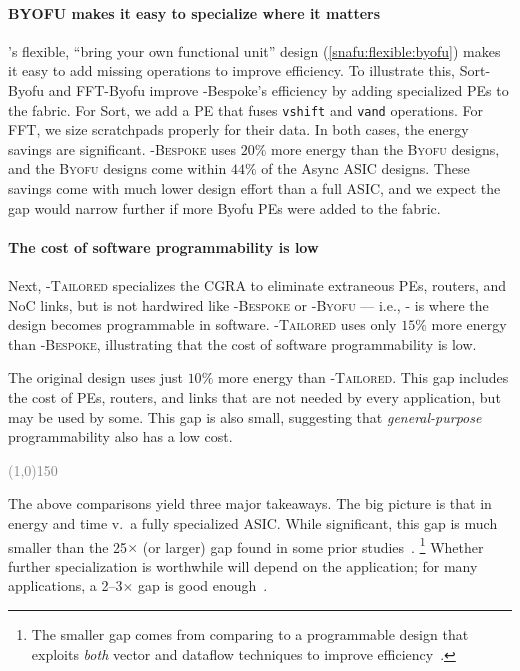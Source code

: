 \paragraph{BYOFU makes it easy to specialize where it matters}
\snafu's flexible, ``bring your own functional unit'' design
(\autoref{snafu:flexible:byofu}) makes it easy to add missing operations
to improve efficiency.
%
To illustrate this,
Sort-{\sc Byofu} and FFT-{\sc Byofu}
improve {\sc \snafu-Bespoke}'s efficiency by adding specialized PEs to the fabric.
% 
For Sort, we add a PE that fuses {\tt vshift} and {\tt vand} operations.
% 
For FFT, we size scratchpads properly for their data.
% 
In both cases, the energy savings are significant.
% 
{\scshape \snafu-Bespoke} uses $20\%$ more energy than the {\scshape Byofu} designs, and the {\scshape Byofu} designs come within $44\%$ of the {\sc Async} ASIC designs.
%
These savings come with much lower design effort than a full ASIC, and we
expect the gap would narrow further if more {\sc Byofu} PEs were added to the fabric.
%

\paragraph{The cost of software programmability is low}
Next, {\scshape \snafu-Tailored} specializes the CGRA to eliminate
extraneous PEs, routers, and NoC links, but is not hardwired like {\scshape \snafu-Bespoke} or {\scshape \snafu-Byofu} ---
%
i.e., \snafu- is where the design becomes programmable in software.
% 
{\scshape \snafu-Tailored} uses only $15\%$ more energy than {\scshape
\snafu-Bespoke}, illustrating that the cost of software programmability is low.


The original \snafuarch design uses just $10\%$ more energy
than {\scshape \snafu-Tailored}.
%
This gap includes the cost of PEs, routers, and links that are
not needed by every application, but may be used by some.
%
This gap is also small, suggesting that \emph{general-purpose}
programmability also has a low cost.
%

\newcommand{\hbreak}{\vspace{-0.6em}\begin{center}\textcolor{gray}{\line(1,0){150}}\end{center}\vspace{-0.1em}}

\hbreak

The above comparisons yield three major takeaways.
%
The big picture is that  in energy and time v.\ a fully specialized ASIC.
%
While significant, this gap is much smaller than the 25$\times$ (or larger) gap found in some prior studies~\cite{hameed2010understanding}.%
%
\footnote{The smaller gap comes from comparing to a programmable design that
exploits \emph{both} vector and dataflow techniques to improve
efficiency~\cite{nowatzki2017domain,nowatzki2016dsa}.}
%
Whether further specialization is worthwhile will depend on the application;
for many applications, a 2--3$\times$ gap is good enough~\cite{hotmobile2021}.


